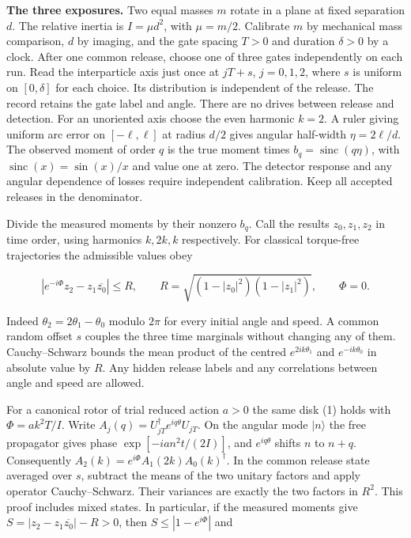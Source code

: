 \documentclass[11pt,a4paper]{article}
\begin{document}
\textbf{The three exposures.} Two equal masses \(m\) rotate in a plane
at fixed separation \(d\). The relative inertia is \(I=\mu d^2\), with
\(\mu=m/2\). Calibrate \(m\) by mechanical mass comparison, \(d\) by
imaging, and the gate spacing \(T>0\) and duration \(\delta>0\) by a
clock. After one common release, choose one of three gates independently
on each run. Read the interparticle axis just once at \(jT+s\),
\(j=0,1,2\), where \(s\) is uniform on \([0,\delta]\) for each choice.
Its distribution is independent of the release. The record retains the
gate label and angle. There are no drives between release and detection.
For an unoriented axis choose the even harmonic \(k=2\). A ruler giving
uniform arc error on \([-\ell,\ell]\) at radius \(d/2\) gives angular
half-width \(\eta=2\ell/d\). The observed moment of order \(q\) is the
true moment times \(b_q=\operatorname{sinc}(q\eta)\), with
\(\operatorname{sinc}(x)=\sin(x)/x\) and value one at zero. The detector
response and any angular dependence of losses require independent
calibration. Keep all accepted releases in the denominator.

Divide the measured moments by their nonzero \(b_q\). Call the results
\(z_0,z_1,z_2\) in time order, using harmonics \(k,2k,k\) respectively.
For classical torque-free trajectories the admissible values obey

\[
 \left|e^{-i\Phi}z_2-z_1\overline{z_0}\right|\le R,\qquad
 R=\sqrt{(1-|z_0|^2)(1-|z_1|^2)},\qquad \Phi=0.                 \tag{1}
\]

Indeed \(\theta_2=2\theta_1-\theta_0\) modulo \(2\pi\) for every initial
angle and speed. A common random offset \(s\) couples the three time
marginals without changing any of them. Cauchy--Schwarz bounds the mean
product of the centred \(e^{2ik\theta_1}\) and \(e^{-ik\theta_0}\) in
absolute value by \(R\). Any hidden release labels and any correlations
between angle and speed are allowed.

For a canonical rotor of trial reduced action \(a>0\) the same disk (1)
holds with \(\Phi=ak^2T/I\). Write \(A_j(q)=U_{jT}^\dagger
e^{iq\theta}U_{jT}\). On the angular mode \(|n\rangle\) the free
propagator gives phase \(\exp[-ian^2t/(2I)]\), and \(e^{iq\theta}\)
shifts \(n\) to \(n+q\). Consequently
\(A_2(k)=e^{i\Phi}A_1(2k)A_0(k)^\dagger\). In the common release state
averaged over \(s\), subtract the means of the two unitary factors and
apply operator Cauchy--Schwarz. Their variances are exactly the two
factors in \(R^2\). This proof includes mixed states. In particular, if
the measured moments give \(S=|z_2-z_1\overline{z_0}|-R>0\), then
\(S\le |1-e^{i\Phi}|\) and
\end{document}
